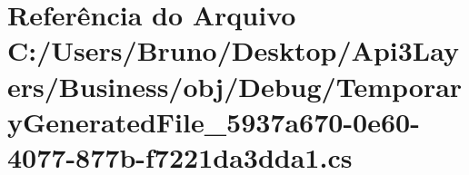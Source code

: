 \hypertarget{Business_2obj_2Debug_2TemporaryGeneratedFile__5937a670-0e60-4077-877b-f7221da3dda1_8cs}{}\section{Referência do Arquivo C\+:/\+Users/\+Bruno/\+Desktop/\+Api3\+Layers/\+Business/obj/\+Debug/\+Temporary\+Generated\+File\+\_\+5937a670-\/0e60-\/4077-\/877b-\/f7221da3dda1.cs}
\label{Business_2obj_2Debug_2TemporaryGeneratedFile__5937a670-0e60-4077-877b-f7221da3dda1_8cs}
